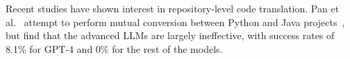Recent studies have shown interest in repository-level code translation. Pan et al.~\cite{pan2024lost} attempt to perform mutual conversion between Python and Java projects~\cite{apachecommonscli,click}, but find that the advanced LLMs are largely ineffective, with success rates of 8.1\% for GPT-4 and 0\% for the rest of the models. 



